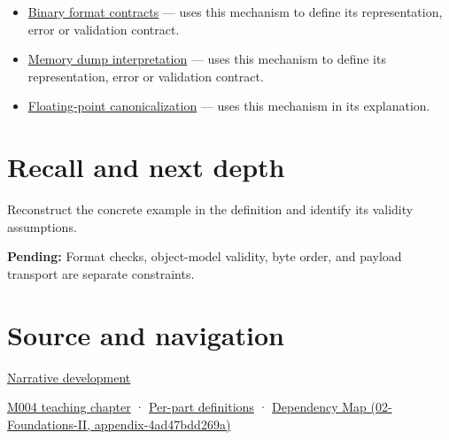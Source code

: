 \begin{itemize}
\item
  \hyperref[appendix-590bbb2424c1]{Binary format contracts} --- uses this mechanism to define its representation, error or validation contract.
\item
  \hyperref[appendix-230b59c0676b]{Memory dump interpretation} --- uses this mechanism to define its representation, error or validation contract.
\item
  \hyperref[appendix-e90053a4b201]{Floating-point canonicalization} --- uses this mechanism in its explanation.
\end{itemize}

\section{Recall and next depth}\label{appendix-34ee45f161c1-recall-and-next-depth}

Reconstruct the concrete example in the definition and identify its validity assumptions.

\textbf{Pending:} Format checks, object-model validity, byte order, and payload transport are separate constraints.

\section{Source and navigation}\label{appendix-34ee45f161c1-source-and-navigation}

\href{Continuous\%20Notes/Computing\%20Foundations\%20-\%20From\%20Bits\%20to\%20C++\%20and\%20Systems\%20APIs\#Bytes\%20become\%20a\%20durable\%20agreement}{Narrative development}

\href{Continuous\%20Notes/Computing\%20Foundations\%20-\%20From\%20Bits\%20to\%20C++\%20and\%20Systems\%20APIs\#A\%20stretching\%20ruler\%20for\%20real-valued\%20quantities}{M004 teaching chapter} · \hyperref[appendix-fd090d982a15-m004---parts-61-76]{Per-part definitions} · \href{../02-Foundations-II/main.pdf\#nameddest=appendix-4ad47bdd269a}{Dependency Map (02-Foundations-II, appendix-4ad47bdd269a)}
